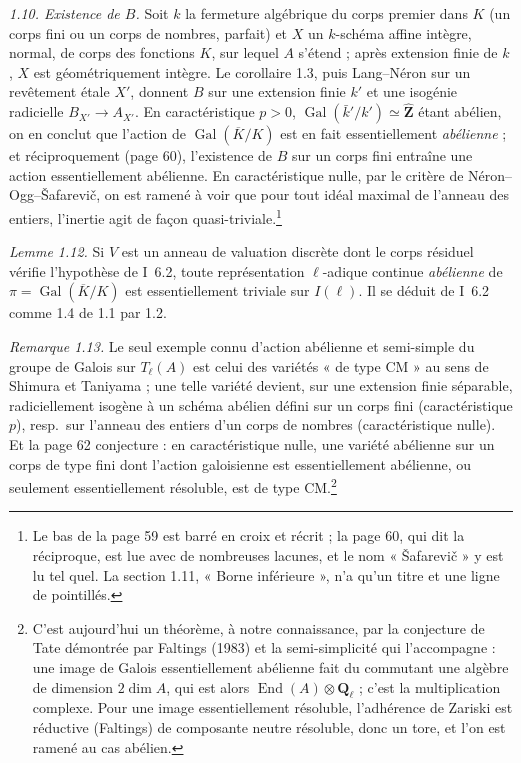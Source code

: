 \documentclass[11pt,a4paper]{article}
\begin{document}
\emph{1.10. Existence de $B$.} Soit $k$ la fermeture algébrique du corps premier
dans $K$ (un corps fini ou un corps de nombres, parfait) et $X$ un
$k$-schéma affine intègre, normal, de corps des fonctions $K$, sur lequel $A$
s'étend ; après extension finie de $k$, $X$ est géométriquement intègre. Le
corollaire 1.3, puis Lang--Néron sur un revêtement étale $X'$, donnent $B$ sur
une extension finie $k'$ et une isogénie radicielle $B_{X'} \to A_{X'}$. En
caractéristique $p > 0$, $\operatorname{Gal}(\bar k'/k') \simeq
\widehat{\mathbf{Z}}$ étant abélien, on en conclut que l'action de
$\operatorname{Gal}(\overline K/K)$ est en fait essentiellement \emph{abélienne} ;
et réciproquement (page 60), l'existence de $B$ sur un corps fini entraîne une
action essentiellement abélienne. En caractéristique nulle, par le critère de
Néron--Ogg--Šafarevič, on est ramené à voir que pour tout idéal maximal de
l'anneau des entiers, l'inertie agit de façon quasi-triviale.\footnote{Le bas de
la page 59 est barré en croix et récrit ; la page 60, qui dit la réciproque, est
lue avec de nombreuses lacunes, et le nom « Šafarevič » y est lu tel quel. La
section 1.11, « Borne inférieure », n'a qu'un titre et une ligne de
pointillés.}

\emph{Lemme 1.12.} Si $V$ est un anneau de valuation discrète dont le corps
résiduel vérifie l'hypothèse de I~6.2, toute représentation $\ell$-adique
continue \emph{abélienne} de $\pi = \operatorname{Gal}(\overline K / K)$ est
essentiellement triviale sur $I(\ell)$. Il se déduit de I~6.2 comme 1.4 de
1.1 par 1.2.

\emph{Remarque 1.13.} Le seul exemple connu d'action abélienne et semi-simple
du groupe de Galois sur $T_\ell(A)$ est celui des variétés « de type CM » au sens
de Shimura et Taniyama ; une telle variété devient, sur une extension finie
séparable, radiciellement isogène à un schéma abélien défini sur un corps fini
(caractéristique $p$), resp.\ sur l'anneau des entiers d'un corps de nombres
(caractéristique nulle). Et la page 62 conjecture : en caractéristique nulle,
une variété abélienne sur un corps de type fini dont l'action galoisienne est
essentiellement abélienne, ou seulement essentiellement résoluble, est de
type CM.\footnote{C'est aujourd'hui un théorème, à notre connaissance, par la
conjecture de Tate démontrée par Faltings (1983) et la semi-simplicité qui
l'accompagne : une image de Galois essentiellement abélienne fait du commutant
une algèbre de dimension $2\dim A$, qui est alors $\operatorname{End}(A)
\otimes \mathbf{Q}_\ell$ ; c'est la multiplication complexe. Pour une image
essentiellement résoluble, l'adhérence de Zariski est réductive (Faltings) de
composante neutre résoluble, donc un tore, et l'on est ramené au cas abélien.}
\end{document}

